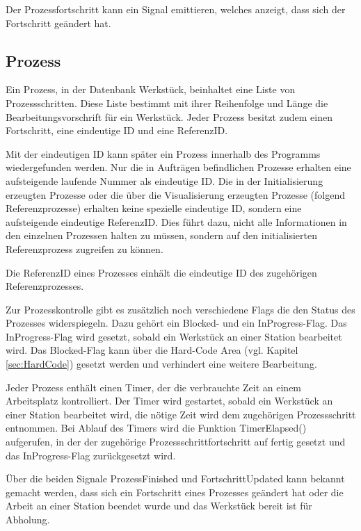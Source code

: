Der Prozessfortschritt kann ein Signal emittieren, welches anzeigt, dass sich der Fortschritt geändert hat.

\subsection{Prozess}
\label{sec:Prozess}

Ein Prozess, in der Datenbank Werkstück, beinhaltet eine Liste von Prozessschritten. Diese Liste bestimmt mit ihrer Reihenfolge und Länge die Bearbeitungsvorschrift für ein Werkstück. Jeder Prozess besitzt zudem einen Fortschritt, eine eindeutige ID und eine ReferenzID. 

Mit der eindeutigen ID kann später ein Prozess innerhalb des Programms wiedergefunden werden. Nur die in Aufträgen befindlichen Prozesse erhalten eine aufsteigende laufende Nummer als eindeutige ID. Die in der Initialisierung erzeugten Prozesse oder die über die Visualisierung erzeugten Prozesse (folgend Referenzprozesse) erhalten keine spezielle eindeutige ID, sondern eine aufsteigende eindeutige ReferenzID. Dies führt dazu, nicht alle Informationen in den einzelnen Prozessen halten zu müssen, sondern auf den initialisierten Referenzprozess zugreifen zu können. 

Die ReferenzID eines Prozesses einhält die eindeutige ID des zugehörigen Referenzprozesses. 

Zur Prozesskontrolle gibt es zusätzlich noch verschiedene Flags die den Status des Prozesses widerspiegeln. Dazu gehört ein Blocked- und ein InProgress-Flag. Das InProgress-Flag wird gesetzt, sobald ein Werkstück an einer Station bearbeitet wird. Das Blocked-Flag kann über die Hard-Code Area (vgl. Kapitel \ref{sec:HardCode}) gesetzt werden und verhindert eine weitere Bearbeitung. 

Jeder Prozess enthält einen Timer, der die verbrauchte Zeit an einem Arbeitsplatz kontrolliert. Der Timer wird gestartet, sobald ein Werkstück an einer Station bearbeitet wird, die nötige Zeit wird dem zugehörigen Prozessschritt entnommen. Bei Ablauf des Timers wird die Funktion TimerElapsed() aufgerufen, in der der zugehörige Prozessschrittfortschritt auf fertig gesetzt und das InProgress-Flag zurückgesetzt wird. 

Über die beiden Signale ProzessFinished und FortschrittUpdated kann bekannt gemacht werden, dass sich ein Fortschritt eines Prozesses geändert hat oder die Arbeit an einer Station beendet wurde und das Werkstück bereit ist für Abholung.

